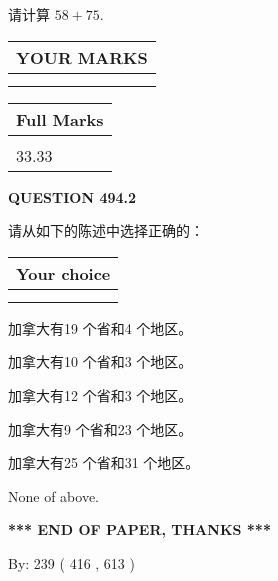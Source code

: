 \documentclass{ctexart}
\begin{document}
  
 
请计算 $ %
58 +  %
75 $.
 

 

 
  
\vspace{0.2in}
  
\noindent\begin{tabular}{|l|}
\hline
 YOUR MARKS  \\
\hline
 \\ 
 \\ 
\hline
\end{tabular}
\hspace{0.05in} \begin{tabular}{|l|}
\hline
 Full Marks  \\
\hline
 \\ 
33.33 \\
\hline
\end{tabular}
{\textbf{\Large{QUESTION
494.2 
}}}
  
  
请从如下的陈述中选择正确的：
  
  
\noindent\hspace{3.0in} \begin{tabular}{|l|}
\hline
Your choice \\
\hline
 \\ 
 \\ 
\hline
\end{tabular}
  
  
 
 
加拿大有19 个省和4 个地区。
 
 
加拿大有10 个省和3 个地区。
 
 
加拿大有12 个省和3 个地区。
 
 
加拿大有9 个省和23 个地区。
 
 
加拿大有25 个省和31 个地区。
 
 
 None of above.
 
 
   
   
 \vspace{0.2in}
 
   
   
   
   
\vspace{1.0in} 
{\textbf{\large{ *** END OF PAPER, THANKS *** }}} 
   
   
\hspace{1.0in} By: 
 239 ( 416 ,  613 )
   
\end{document}
